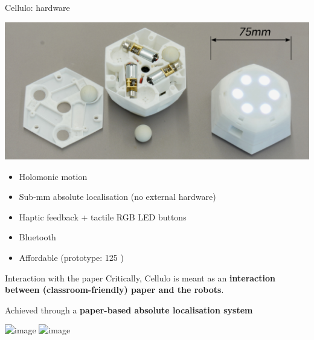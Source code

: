 \documentclass[compress]{beamer}
\begin{document}
 \begin{frame}{Cellulo: hardware}
     \begin{center}
         \includegraphics[width=0.8\linewidth]{cellulo/hardware-design}
     \end{center}
     \begin{itemize}
         \item Holomonic motion
         \item Sub-mm absolute localisation (no external hardware)
         \item Haptic feedback + tactile RGB LED buttons 
         \item Bluetooth
         \item<2> Affordable (prototype: 125 \EUR)
     \end{itemize}
 \end{frame}


{
 \begin{frame}{Interaction with the paper}
     Critically, Cellulo is meant as an {\bf interaction between
     (classroom-friendly) paper and the robots}.

     \pause

     Achieved through a {\bf paper-based absolute localisation system}

     \begin{center}
         \includegraphics<3>[width=0.8\linewidth]{cellulo/treasure-game-1}
         \includegraphics<4>[width=\linewidth]{cellulo/treasure-game-2}
     \end{center}


 \end{frame}
}
\end{document}
